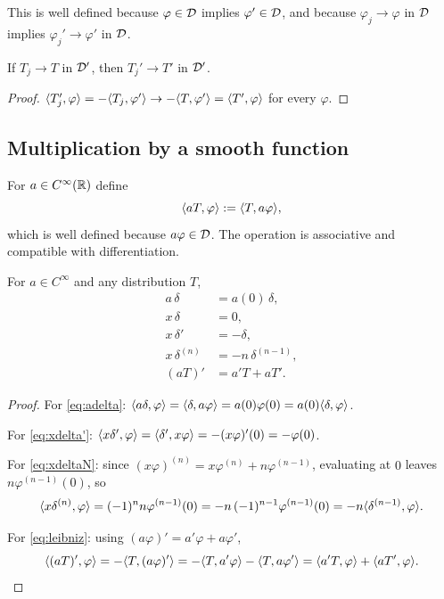This is well defined because $\varphi\in\mathcal{D}$ implies $\varphi'\in\mathcal{D}$, and because
$\varphi_{j}\to\varphi$ in $\mathcal{D}$ implies $\varphi_{j}'\to\varphi'$ in $\mathcal{D}$.

\begin{proposition}\label{prop:derivcont}
If $T_{j}\to T$ in $\mathcal{D}'$, then $T_{j}'\to T'$ in $\mathcal{D}'$.
\end{proposition}

\begin{proof}
$\langle T_{j}',\varphi\rangle=-\langle T_{j},\varphi'\rangle\to-\langle T,\varphi'\rangle=\langle T',\varphi\rangle$ for every
$\varphi$.
\end{proof}

\subsection*{Multiplication by a smooth function}

For $a\in C^{\infty}(\mathbb{R})$ define
\begin{equation}
\langle aT,\varphi\rangle:=\langle T,a\varphi\rangle,
\end{equation}
which is well defined because $a\varphi\in\mathcal{D}$. The operation is associative and compatible with
differentiation.

\begin{proposition}\label{prop:mult-rules}
For $a\in C^{\infty}$ and any distribution $T$,
\begin{align}
a\,\delta&=a(0)\,\delta, \label{eq:adelta}\\
x\,\delta&=0, \label{eq:xdelta}\\
x\,\delta'&=-\delta, \label{eq:xdelta'}\\
x\,\delta^{(n)}&=-n\,\delta^{(n-1)}, \label{eq:xdeltaN}\\
(aT)'&=a'T+aT' . \label{eq:leibniz}
\end{align}
\end{proposition}

\begin{proof}
For \eqref{eq:adelta}: $\langle a\delta,\varphi\rangle=\langle \delta,a\varphi\rangle=a(0)\varphi(0)=a(0)\langle \delta,\varphi\rangle$.

For \eqref{eq:xdelta'}: $\langle x\delta',\varphi\rangle=\langle \delta',x\varphi\rangle=-(x\varphi)'(0)=-\varphi(0)$.

For \eqref{eq:xdeltaN}: since $(x\varphi)^{(n)}=x\varphi^{(n)}+n\varphi^{(n-1)}$, evaluating at $0$
leaves $n\varphi^{(n-1)}(0)$, so
\begin{equation}
\langle x\delta^{(n)},\varphi\rangle=(-1)^{n}n\varphi^{(n-1)}(0)
=-n\,(-1)^{n-1}\varphi^{(n-1)}(0)=-n\langle \delta^{(n-1)},\varphi\rangle.
\end{equation}

For \eqref{eq:leibniz}: using $(a\varphi)'=a'\varphi+a\varphi'$,
\begin{equation}
\langle (aT)',\varphi\rangle=-\langle T,(a\varphi)'\rangle
=-\langle T,a'\varphi\rangle-\langle T,a\varphi'\rangle
=\langle a'T,\varphi\rangle+\langle aT',\varphi\rangle. \qedhere
\end{equation}
\end{proof}

